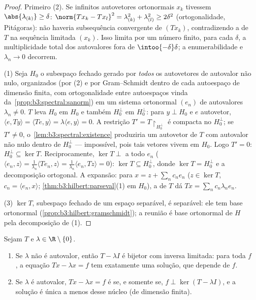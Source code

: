 \begin{proof}
Primeiro (2). Se infinitos autovetores ortonormais $x_k$ tivessem
$\abs{\lambda_{(k)}} \geq \delta$: $\norm{Tx_k - Tx_l}^2 =
\lambda_{(k)}^2 + \lambda_{(l)}^2 \geq 2\delta^2$ (ortogonalidade, Pitágoras): não haveria subsequência
convergente de $(Tx_k)$, contradizendo a  de $T$ na
sequência limitada $(x_k)$. Isso limita por um número finito, para
cada $\delta$, a multiplicidade total dos autovalores fora de $\intoo{-\delta}\delta$;
a enumerabilidade e $\lambda_n \to 0$ decorrem.

(1) Seja $H_0$ o subespaço fechado gerado por \emph{todos} os
autovetores de autovalor não nulo, organizados (por (2) e por
Gram--Schmidt dentro de cada autoespaço de dimensão finita, com
ortogonalidade entre autoespaços vinda da~\cref{prop:b3:spectral:sanorm}) em um sistema
ortonormal $(e_n)$ de autovalores $\lambda_n \neq 0$. $T$ leva $H_0$ em
$H_0$ e também $H_0^\perp$ em $H_0^\perp$: para $y
\perp H_0$ e $e$ autovetor, $\langle e, Ty\rangle =
\langle Te, y\rangle = \lambda\langle e, y\rangle = 0$.
A restrição $T' = T\restriction_{H_0^\perp}$ é compacta  no  $H_0^\perp$; se
$T' \neq
0$, o~\cref{lem:b3:spectral:existence} produziria um autovetor de $T$ com autovalor
não nulo dentro de $H_0^\perp$ --- impossível, pois tais vetores vivem em
$H_0$. Logo $T' = 0$: $H_0^\perp \subseteq \ker T$. Reciprocamente, $\ker T \perp$ a todo
$e_n$ ($\langle e_n, z\rangle = \frac1{\lambda_n}\langle
Te_n, z\rangle = \frac1{\lambda_n}\langle e_n, Tz\rangle =
0$): $\ker T \subseteq H_0^\perp$, donde $\ker T =
H_0^\perp$ e a decomposição ortogonal. A
expansão: para $x = z + \sum_nc_ne_n$ ($z \in \ker T$, $c_n = \langle
e_n, x\rangle$; \cref{thm:b3:hilbert:parseval}(1) em $H_0$), a
 de $T$ dá $Tx = \sum_nc_n\lambda_ne_n$.

(3) $\ker T$, subespaço fechado de um espaço separável, é separável:
ele tem base ortonormal (\cref{prop:b3:hilbert:gramschmidt}); a reunião é base ortonormal
de $H$ pela decomposição de (1).
\end{proof}

\begin{theorem}
\label{thm:b3:spectral:fredholm}
Sejam $T$   e $\lambda \in \R\setminus
\{0\}$.
\begin{enumerate}
  \item Se $\lambda$ não é autovalor, então $T - \lambda I$ é bijetor com inversa
        limitada: para toda $f$, a equação $Tx - \lambda x = f$ tem exatamente uma
        solução, que depende  de $f$.
  \item Se $\lambda$ é autovalor, $Tx - \lambda x = f$ é  se, e somente se, $f \perp \ker(T - \lambda I)$, e
        a solução é única a menos desse núcleo (de dimensão finita).
\end{enumerate}
\end{theorem}

